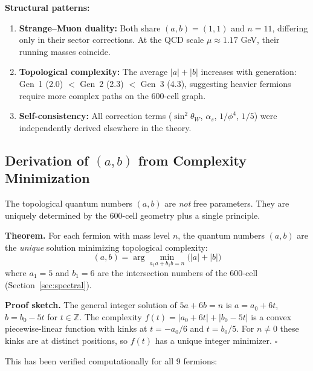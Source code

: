 \documentclass[12pt,a4paper]{article}
\begin{document}
\textbf{Structural patterns:}
\begin{enumerate}
\item \textbf{Strange--Muon duality:} Both share $(a,b) = (1,1)$ and $n=11$, differing only in their sector corrections. At the QCD scale $\mu \approx 1.17$ GeV, their running masses coincide.
\item \textbf{Topological complexity:} The average $|a|+|b|$ increases with generation: Gen~1 (2.0) $<$ Gen~2 (2.3) $<$ Gen~3 (4.3), suggesting heavier fermions require more complex paths on the 600-cell graph.
\item \textbf{Self-consistency:} All correction terms ($\sin^2\theta_W$, $\alpha_s$, $1/\phi^4$, $1/5$) were independently derived elsewhere in the theory.
\end{enumerate}

\subsection{Derivation of $(a,b)$ from Complexity Minimization}
\label{sec:ab_derivation}

The topological quantum numbers $(a,b)$ are \emph{not} free parameters. They are uniquely determined by the 600-cell geometry plus a single principle.

\textbf{Theorem.} For each fermion with mass level $n$, the quantum numbers $(a,b)$ are the \emph{unique} solution minimizing topological complexity:
\begin{equation}
\boxed{(a,b) = \arg\min_{a_1 a + b_1 b = n} \bigl(|a| + |b|\bigr)}
\end{equation}
where $a_1 = 5$ and $b_1 = 6$ are the intersection numbers of the 600-cell (Section~\ref{sec:spectral}).

\textbf{Proof sketch.} The general integer solution of $5a + 6b = n$ is $a = a_0 + 6t$, $b = b_0 - 5t$ for $t \in \mathbb{Z}$. The complexity $f(t) = |a_0 + 6t| + |b_0 - 5t|$ is a convex piecewise-linear function with kinks at $t = -a_0/6$ and $t = b_0/5$. For $n \neq 0$ these kinks are at distinct positions, so $f(t)$ has a unique integer minimizer. $\square$

This has been verified computationally for all 9 fermions:
\end{document}
